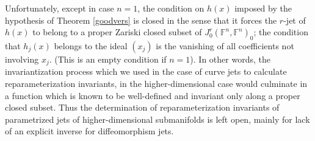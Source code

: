 \documentclass[12pt]{article}
\numberwithin{equation}{section}
\theoremstyle{plain}
\theoremstyle{definition}
\newcommand{\Fb}{\mathbb{F}}
\begin{document}
Unfortunately, except in case $n=1$, the condition on $h(x)$ imposed by the hypothesis of Theorem \ref{goodvers} is closed in the sense that it forces the $r$-jet of $h(x)$ to belong to a proper Zariski closed subset of $J^{r}_0(\Fb^{n},\Fb^{n})_0$; the condition that $h_j(x)$ belongs to the ideal $(x_j)$ is the vanishing of all coefficients not involving $x_j$. (This is an empty condition if $n=1$). In other words, the invariantization process which we used in the case of curve jets to calculate reparameterization invariants, in the higher-dimensional case would culminate in a function which is known to be well-defined and invariant only along a proper closed subset. Thus the determination of reparameterization invariants of parametrized jets of higher-dimensional submanifolds is left open, mainly for lack of an explicit inverse for diffeomorphism jets.









\end{document}
